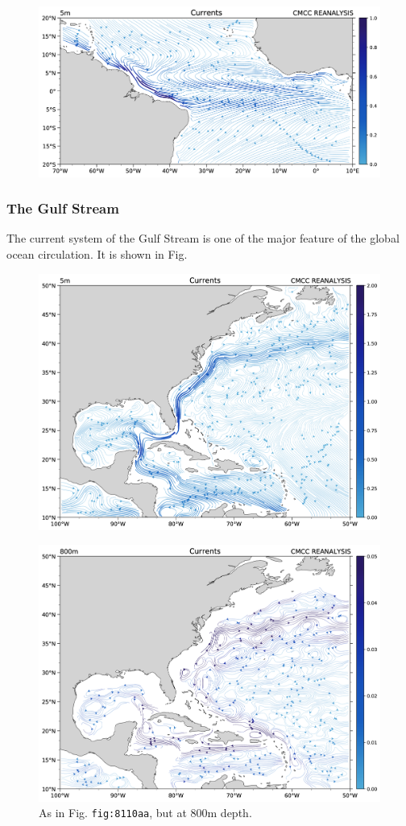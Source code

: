 \begin{figure}
\centering
\includegraphics[width = .7 \textwidth]{figs/GD/UVstream5mATLEQ.png}
\caption{} \label{fig:}
\end{figure}

\subsubsection{The Gulf Stream}\label{the-gulf-stream}

The current system of the Gulf Stream is one of the major feature of the
global ocean circulation. It is shown in Fig.

\begin{figure}
\centering
\includegraphics[width = .7 \textwidth]{figs/GD/UVstream5mATLCARIB.png}
\caption{} \label{fig:}
\end{figure}

\begin{figure}
\centering
\includegraphics[width = .7 \textwidth]{figs/GD/UVstream800mATLCARIB.png}
\caption{As in Fig. \texttt{fig:8110aa}, but at 800m depth.}
\end{figure}

